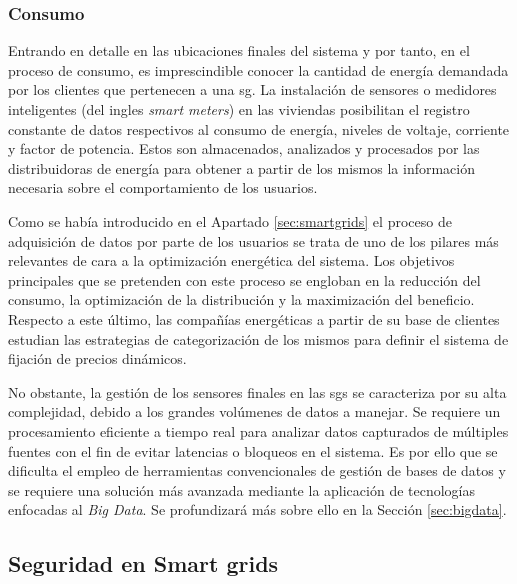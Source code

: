 \subsubsection{Consumo}
\label{sec:consumo}

Entrando en detalle en las ubicaciones finales del sistema y por tanto, en el proceso de consumo, es imprescindible conocer la cantidad de energía demandada por los clientes que pertenecen a una \gls{sg}. La instalación de sensores o medidores inteligentes (del ingles \textit{smart meters}) en las viviendas posibilitan el registro constante de datos respectivos al consumo de energía, niveles de voltaje, corriente y factor de potencia. Estos son almacenados, analizados y procesados por las distribuidoras de energía para obtener a partir de los mismos la información necesaria sobre el comportamiento de los usuarios. \cite{stab}

\vspace{3mm}

Como se había introducido en el Apartado \ref{sec:smartgrids} el proceso de adquisición de datos por parte de los usuarios se trata de uno de los pilares más relevantes de cara a la optimización energética del sistema. Los objetivos principales que se pretenden con este proceso se engloban en la reducción del consumo, la optimización de la distribución y la maximización del beneficio. Respecto a este último, las compañías energéticas a partir de su base de clientes estudian las estrategias de categorización de los mismos para definir el sistema de fijación de precios dinámicos. \cite{stab}

\vspace{3mm}

No obstante, la gestión de los sensores finales en las \gls{sg}s se caracteriza por su alta complejidad, debido a los grandes volúmenes de datos a manejar. Se requiere un procesamiento eficiente a tiempo real para analizar datos capturados de múltiples fuentes con el fin de evitar latencias o bloqueos en el sistema. Es por ello que se dificulta el empleo de herramientas convencionales de gestión de bases de datos y se requiere una solución más avanzada mediante la aplicación de tecnologías enfocadas al \textit{Big Data}. Se profundizará más sobre ello en la Sección \ref{sec:bigdata}.


\subsection{Seguridad en Smart grids}
\label{sec:seg}
 
